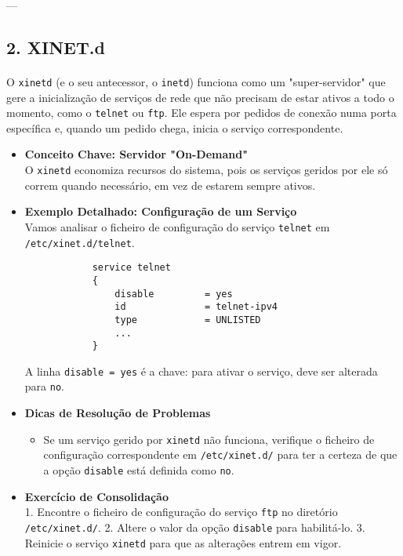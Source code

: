\documentclass[10pt,a4paper]{article}
\begin{document}
	---
	
	\subsection*{2. XINET.d}
	\vspace{-1.2em}
	\paragraph{}
	O \texttt{xinetd} (e o seu antecessor, o \texttt{inetd}) funciona como um "super-servidor" que gere a inicialização de serviços de rede que não precisam de estar ativos a todo o momento, como o \texttt{telnet} ou \texttt{ftp}. Ele espera por pedidos de conexão numa porta específica e, quando um pedido chega, inicia o serviço correspondente.
	
	\begin{itemize}
		\item \textbf{Conceito Chave: Servidor "On-Demand"} \\
		O \texttt{xinetd} economiza recursos do sistema, pois os serviços geridos por ele só correm quando necessário, em vez de estarem sempre ativos.
		
		\item \textbf{Exemplo Detalhado: Configuração de um Serviço} \\
		Vamos analisar o ficheiro de configuração do serviço \texttt{telnet} em \texttt{/etc/xinet.d/telnet}.
		\begin{verbatim}
			service telnet
			{
				disable         = yes
				id              = telnet-ipv4
				type            = UNLISTED
				...
			}
		\end{verbatim}
		A linha \texttt{disable = yes} é a chave: para ativar o serviço, deve ser alterada para \texttt{no}.
		
		\item \textbf{Dicas de Resolução de Problemas} \\
		\begin{itemize}
			\item Se um serviço gerido por \texttt{xinetd} não funciona, verifique o ficheiro de configuração correspondente em \texttt{/etc/xinet.d/} para ter a certeza de que a opção \texttt{disable} está definida como \texttt{no}.
		\end{itemize}
		
		\item \textbf{Exercício de Consolidação} \\
		1. Encontre o ficheiro de configuração do serviço \texttt{ftp} no diretório \texttt{/etc/xinet.d/}.
		2. Altere o valor da opção \texttt{disable} para habilitá-lo.
		3. Reinicie o serviço \texttt{xinetd} para que as alterações entrem em vigor.
	\end{itemize}
	
\end{document}

